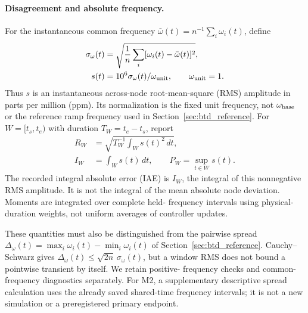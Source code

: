 \paragraph{Disagreement and absolute frequency.}
For the instantaneous common frequency $\bar\omega(t)=n^{-1}\sum_i\omega_i(t)$,
define
\begin{align}
 \sigma_\omega(t)&=\sqrt{\frac1n\sum_i[\omega_i(t)-\bar\omega(t)]^2},\nonumber\\
 s(t)&=10^6\sigma_\omega(t)/\omega_{\rm unit},\qquad\omega_{\rm unit}=1.
 \label{eq:eval_disagreement_amplitude}
\end{align}
Thus $s$ is an instantaneous across-node root-mean-square (RMS)
amplitude in parts per million (ppm). Its normalization is the fixed
unit frequency, not $\omega_{\rm base}$ or the reference ramp frequency
used in Section~\ref{sec:btd_reference}. For $W=[t_s,t_e)$ with duration
$T_W=t_e-t_s$, report
\begin{align}
 R_W&=\sqrt{T_W^{-1}\int_W s(t)^2\,dt},\nonumber\\
 I_W&=\int_W s(t)\,dt,\qquad P_W=\sup_{t\in W}s(t).
 \label{eq:eval_frequency_metrics}
\end{align}
The recorded integral absolute error (IAE) is $I_W$, the integral of
this nonnegative RMS amplitude. It is not the integral of the mean
absolute node deviation. Moments are integrated over complete held-
frequency intervals using physical-duration weights, not uniform
averages of controller updates.

These quantities must also be distinguished from the pairwise spread
$\Delta_\omega(t)=\max_i\omega_i(t)-\min_i\omega_i(t)$ of
Section~\ref{sec:btd_reference}. Cauchy--Schwarz gives
$\Delta_\omega(t)\le\sqrt{2n}\,\sigma_\omega(t)$, but a window RMS
does not bound a pointwise transient by itself. We retain positive-
frequency checks and common-frequency diagnostics separately. For M2,
a supplementary descriptive spread calculation uses the already saved
shared-time frequency intervals; it is not a new simulation or a
preregistered primary endpoint.

